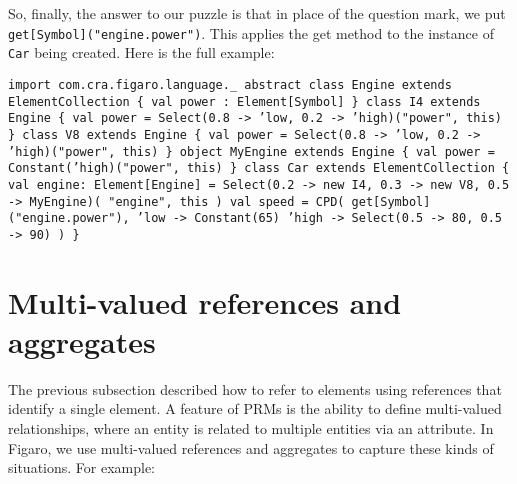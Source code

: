 So, finally, the answer to our puzzle is that in place of the question mark, we put \texttt{get[Symbol]("engine.power")}. This applies the get method to the instance of \texttt{Car} being created. Here is the full example:

\begin{flushleft}
\texttt{import com.cra.figaro.language.\_
\newline
\newline abstract class Engine extends ElementCollection \{
\newline \tab val power : Element[Symbol]
\newline \}
\newline class I4 extends Engine \{
\newline \tab val power = Select(0.8 -> 'low, 0.2 -> 'high)("power", this)
\newline \}
\newline class V8 extends Engine \{
\newline \tab val power = Select(0.8 -> 'low, 0.2 -> 'high)("power", this)
\newline \}
\newline object MyEngine extends Engine \{
\newline \tab val power = Constant('high)("power", this)
\newline \}
\newline class Car extends ElementCollection \{
\newline \tab val engine: Element[Engine] =
\newline \tab Select(0.2 -> new I4, 0.3 -> new V8, 0.5 -> MyEngine)(
"engine", this
\newline )
\newline \tab val speed = CPD(
\newline \tab get[Symbol]("engine.power"),
\newline \tab 'low -> Constant(65)
\newline \tab 'high -> Select(0.5 -> 80, 0.5 -> 90)
\newline )
\newline \}
}
\end{flushleft}

\section{Multi-valued references and aggregates}

The previous subsection described how to refer to elements using references that identify a single element. A feature of PRMs is the ability to define multi-valued relationships, where an entity is related to multiple entities via an attribute. In Figaro, we use multi-valued references and aggregates to capture these kinds of situations. For example:

